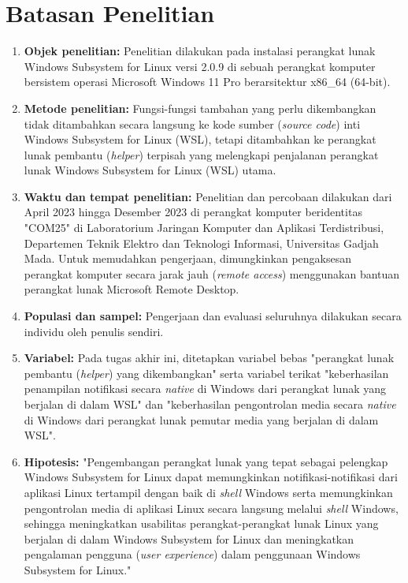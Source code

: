 
\section{Batasan Penelitian}

\begin{enumerate}
    \item \textbf{Objek penelitian:} Penelitian dilakukan pada instalasi perangkat lunak Windows Subsystem for Linux versi 2.0.9 di sebuah perangkat komputer bersistem operasi Microsoft Windows 11 Pro berarsitektur x86\_64 (64-bit).
    
    \item \textbf{Metode penelitian:} Fungsi-fungsi tambahan yang perlu dikembangkan tidak ditambahkan secara langsung ke kode sumber (\textit{source code}) inti Windows Subsystem for Linux (WSL), tetapi ditambahkan ke perangkat lunak pembantu (\textit{helper}) terpisah yang melengkapi penjalanan perangkat lunak Windows Subsystem for Linux (WSL) utama.
    
    \item \textbf{Waktu dan tempat penelitian:} Penelitian dan percobaan dilakukan dari April 2023 hingga Desember 2023 di perangkat komputer beridentitas "COM25" di Laboratorium Jaringan Komputer dan Aplikasi Terdistribusi, Departemen Teknik Elektro dan Teknologi Informasi, Universitas Gadjah Mada. Untuk memudahkan pengerjaan, dimungkinkan pengaksesan perangkat komputer secara jarak jauh (\textit{remote access}) menggunakan bantuan perangkat lunak Microsoft Remote Desktop.
    
    \item \textbf{Populasi dan sampel:} Pengerjaan dan evaluasi seluruhnya dilakukan secara individu oleh penulis sendiri.
    
    \item \textbf{Variabel:} Pada tugas akhir ini, ditetapkan variabel bebas "perangkat lunak pembantu (\textit{helper}) yang dikembangkan" serta variabel terikat "keberhasilan penampilan notifikasi secara \textit{native} di Windows dari perangkat lunak yang berjalan di dalam WSL" dan "keberhasilan pengontrolan media secara \textit{native} di Windows dari perangkat lunak pemutar media yang berjalan di dalam WSL".
    
    \item \textbf{Hipotesis:} "Pengembangan perangkat lunak yang tepat sebagai pelengkap Windows Subsystem for Linux dapat memungkinkan notifikasi-notifikasi dari aplikasi Linux tertampil dengan baik di \textit{shell} Windows serta memungkinkan pengontrolan media di aplikasi Linux secara langsung melalui \textit{shell} Windows, sehingga meningkatkan usabilitas perangkat-perangkat lunak Linux yang berjalan di dalam Windows Subsystem for Linux dan meningkatkan pengalaman pengguna (\textit{user experience}) dalam penggunaan Windows Subsystem for Linux."
        

\end{enumerate}
